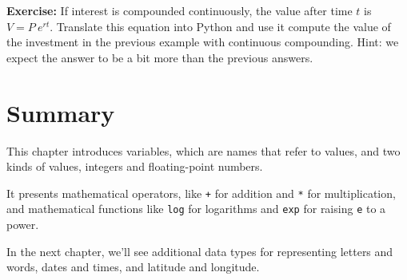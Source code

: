 \documentclass[
]{book}
\newcommand{\passthrough}[1]{#1}
\begin{document}
\textbf{Exercise:} If interest is compounded continuously, the value
after time \(t\) is \(V=P~e^{rt}\). Translate this equation into Python
and use it compute the value of the investment in the previous example
with continuous compounding. Hint: we expect the answer to be a bit more
than the previous answers.

\section{Summary}\label{summary}

This chapter introduces variables, which are names that refer to values,
and two kinds of values, integers and floating-point numbers.

It presents mathematical operators, like \passthrough{\lstinline!+!} for
addition and \passthrough{\lstinline!*!} for multiplication, and
mathematical functions like \passthrough{\lstinline!log!} for logarithms
and \passthrough{\lstinline!exp!} for raising
\passthrough{\lstinline!e!} to a power.

In the next chapter, we'll see additional data types for representing
letters and words, dates and times, and latitude and longitude.

\backmatter
\end{document}
